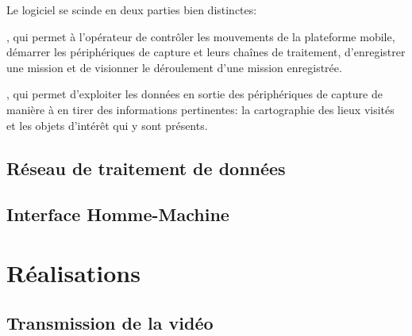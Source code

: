 			\par
			Le logiciel se scinde en deux parties bien distinctes:
			\begin{description}[noitemsep]
				\item[l'Interface Homme-Machine], qui permet à l'opérateur de contrôler les mouvements de la plateforme mobile, démarrer les périphériques de capture et leurs chaînes de traitement, d'enregistrer une mission et de visionner le déroulement d'une mission enregistrée.
				\item[le réseau de traitement de données], qui permet d'exploiter les données en sortie des périphériques de capture de manière à en tirer des informations pertinentes: la cartographie des lieux visités et les objets d'intérêt qui y sont présents.
			\end{description}

		\subsection{Réseau de traitement de données}

			
			
		\subsection{Interface Homme-Machine}
		\label{sub:ihm}


	\section{Réalisations}
	
		\subsection{Transmission de la vidéo}
		
